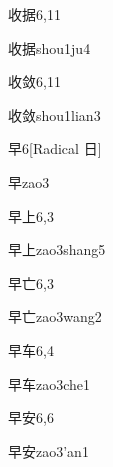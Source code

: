 \begin{entry}{收据}{6,11}
  \begin{phonetics}{收据}{shou1ju4}
  \end{phonetics}
\end{entry}

\begin{entry}{收敛}{6,11}
  \begin{phonetics}{收敛}{shou1lian3}
  \end{phonetics}
\end{entry}

\begin{entry}{早}{6}[Radical 日]
  \begin{phonetics}{早}{zao3}
  \end{phonetics}
\end{entry}

\begin{entry}{早上}{6,3}
  \begin{phonetics}{早上}{zao3shang5}
  \end{phonetics}
\end{entry}

\begin{entry}{早亡}{6,3}
  \begin{phonetics}{早亡}{zao3wang2}
  \end{phonetics}
\end{entry}

\begin{entry}{早车}{6,4}
  \begin{phonetics}{早车}{zao3che1}
  \end{phonetics}
\end{entry}

\begin{entry}{早安}{6,6}
  \begin{phonetics}{早安}{zao3'an1}
  \end{phonetics}
\end{entry}

